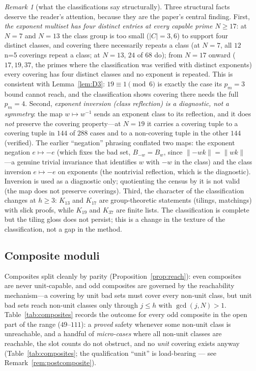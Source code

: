 \documentclass[11pt,a4paper]{article}
\numberwithin{equation}{section}
\theoremstyle{plain}
\theoremstyle{definition}
\theoremstyle{remark}
\newtheorem{remark}[theorem]{Remark}
\begin{document}
\begin{remark}[what the classifications say structurally]\label{rem:pattern}
Three structural facts deserve the reader's attention, because they are
the paper's central finding. First, \emph{the exponent multiset has four
distinct entries at every capable prime $N\ge 17$}: at $N=7$ and $N=13$
the class group is too small ($|C|=3,6$) to support four distinct
classes, and covering there necessarily repeats a class (at $N=7$, all
$12$ n=5 coverings repeat a class; at $N=13$, $24$ of $68$ do); from
$N=17$ onward ($17,19,37$, the primes where the classification was
verified with distinct exponents) every covering has four distinct
classes and no exponent is repeated. This is consistent with
Lemma~\ref{lem:D3}: $19\equiv 1\pmod 6$ is exactly the case its $p_m=3$
bound cannot reach, and the classification shows covering there needs the
full $p_m=4$. Second, \emph{exponent inversion (class reflection) is a
diagnostic, not a symmetry}: the map $w\mapsto w^{-1}$ sends an exponent
class to its reflection, and it does \emph{not} preserve the covering
property---at $N=19$ it carries a covering tuple to a covering tuple in
$144$ of $288$ cases and to a non-covering tuple in the other $144$
(verified). The earlier ``negation'' phrasing conflated two maps: the
exponent negation $e\mapsto-e$ (which fixes the bad set, $B_{-w}=B_w$,
since $\lVert-wk\rVert=\lVert wk\rVert$---a genuine trivial invariance
that identifies $w$ with $-w$ in the class) and the class inversion
$e\mapsto-e$ on exponents (the nontrivial reflection, which is the
diagnostic). Inversion is used as a diagnostic only; quotienting the census by
it is not valid (the map does not preserve coverings). Third, the character
of the classification changes at $h\ge 3$: $K_{13}$ and $K_{17}$ are
group-theoretic statements (tilings, matchings) with slick proofs, while
$K_{19}$ and $K_{37}$ are finite lists. The classification is complete but
the tiling gloss does not persist; this is a change in the texture of
the classification, not a gap in the method.
\end{remark}

\subsection{Composite moduli}\label{sec:composites}

Composites split cleanly by parity (Proposition~\ref{prop:reach}): even
composites are never unit-capable, and odd composites are governed by the
reachability mechanism---a covering by unit bad sets must cover every
non-unit class, but unit bad sets reach non-unit classes only through
$j\le h$ with $\gcd(j,N)>1$. Table~\ref{tab:composites} records the
outcome for every odd composite in the open part of the range
($49$--$111$): a \emph{proved} safety whenever some non-unit class is
unreachable, and a handful of \emph{micro-cases} where all non-unit
classes are reachable, the slot counts do not obstruct, and no \emph{unit}
covering exists anyway (Table~\ref{tab:composites}; the qualification
``unit'' is load-bearing --- see Remark~\ref{rem:postcomposite}).
\end{document}
